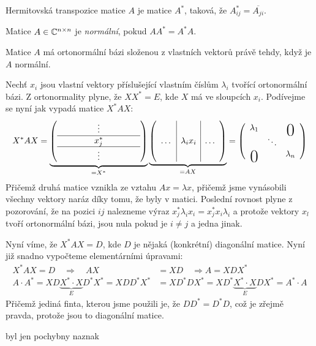 
\df Hermitovská transpozice matice $A$ je matice $A^*$, taková, že $A_{ij}^* = \overline{A_{ji}}$.

\df Matice $A \in \mathbb{C}^{n\times n}$ je {\it normální}, pokud $AA^* = A^*A$.

\vt Matice $A$ má ortonormální bázi složenou z vlastních vektorů právě tehdy, když je $A$ normální.

\dk \begin{description}
	\item \uv{$\Rightarrow$} Nechť $x_i$ jsou vlastní vektory příslušející vlastním číslům $\lambda_i$ tvořící ortonormální bázi. Z ortonormality plyne, že $XX^*=E$, kde $X$ má ve sloupcích $x_i$. Podívejme se nyní jak vypadá matice $X^* A X$:
	\begin{align}
		X^* A X = 
		\underbrace{
		\left(\begin{array}{ccc} &\vdots &\\ \hline \hspace{1cm}& x_j^* & \hspace{1cm}\\ \hline&\vdots& \end{array}\right)}_{=X^*} 
		\underbrace{\left(\begin{array}{c|c|c} \raisebox{5mm}{\ } & &\\ \dots& \lambda_i x_i & \dots\\\raisebox{5mm}{\ }  && \end{array}\right)}_{=AX}
		= \left(\begin{array}{ccc}\lambda_1 &&\bigzero \\ &\ddots & \\ \bigzero&&\lambda_n\end{array}\right)
	\end{align}
	Přičemž druhá matice vznikla ze vztahu $Ax=\lambda x$, přičemž jsme vynásobili všechny vektory naráz díky tomu, že byly v matici. Poslední rovnost plyne z pozorování, že na pozici $ij$ nalezneme výraz $x_j^*\lambda_i x_i = x_j^* x_i \lambda_i$ a protože vektory $x_l$ tvoří ortonormální bázi, jsou nula pokud je $i\neq j$ a jedna jinak.

	Nyní víme, že $X^*AX=D$, kde $D$ je nějaká (konkrétní) diagonální matice. Nyní již snadno vypočteme elementárními úpravami:
	\begin{align*}
		X^* A X = D \quad \Rightarrow \quad AX &= XD \quad \Rightarrow A = XDX^* \\
		A\cdot A^* = XD\underbrace{X^*\cdot X}_ED^*X^* = XDD^*X^*
		&= XD^*DX^* = XD^*\underbrace{X^*\cdot X}_EDX^* = A^*\cdot A
	\end{align*}
	Přičemž jediná finta, kterou jsme použili je, že $DD^* = D^*D$, což je zřejmě pravda, protože jsou to diagonální matice.

	\item \uv{$\Leftarrow$}  byl jen pochybny naznak
\end{description}

